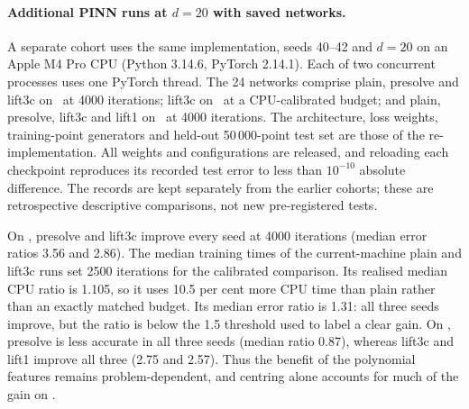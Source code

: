 \paragraph{Additional PINN runs at $d=20$ with saved networks.}\label{S5:sec:current-machine}
A separate cohort uses the same implementation, seeds 40--42 and $d=20$ on an Apple M4 Pro
CPU (Python 3.14.6, PyTorch 2.14.1). Each of two concurrent processes uses one PyTorch thread.
The 24 networks comprise plain, presolve and lift3c on \Pone\ at 4000 iterations; lift3c on
\Pone\ at a CPU-calibrated budget; and plain, presolve, lift3c and lift1 on \Psinlin\ at
4000 iterations. The architecture, loss weights, training-point generators and held-out
50\,000-point test set are those of the re-implementation. All weights and configurations
are released, and reloading each checkpoint reproduces its recorded test error to less than
$10^{-10}$ absolute difference. The records are kept separately from the earlier cohorts;
these are retrospective descriptive comparisons, not new pre-registered tests.

On \Pone, presolve and lift3c improve every seed at 4000 iterations (median error ratios
3.56 and 2.86). The median training times of the current-machine plain and lift3c runs set
2500 iterations for the calibrated comparison. Its realised median CPU ratio is 1.105,
so it uses 10.5 per cent more CPU time than plain rather than an exactly matched budget.
Its median error ratio is 1.31: all three seeds improve, but the ratio is below the 1.5
threshold used to label a clear gain. On \Psinlin, presolve is less accurate in all three
seeds (median ratio 0.87), whereas lift3c and lift1 improve all three (2.75 and 2.57).
Thus the benefit of the polynomial features remains problem-dependent, and centring alone
accounts for much of the gain on \Psinlin.

\begin{table}[htbp]
\centering\small
\caption{Additional PINN runs at $d=20$ with saved networks, seeds 40--42. $\rho$ is the seed-paired
error of plain divided by the arm's error; wins count $\rho>1$. CPU ratio is the ratio of
median measured training times to plain at 4000 iterations, on the same machine. The
calibrated budget is selected from the first-stage timing medians, not from historical timing.}
\label{S5:tab:current-machine}

\end{table}

